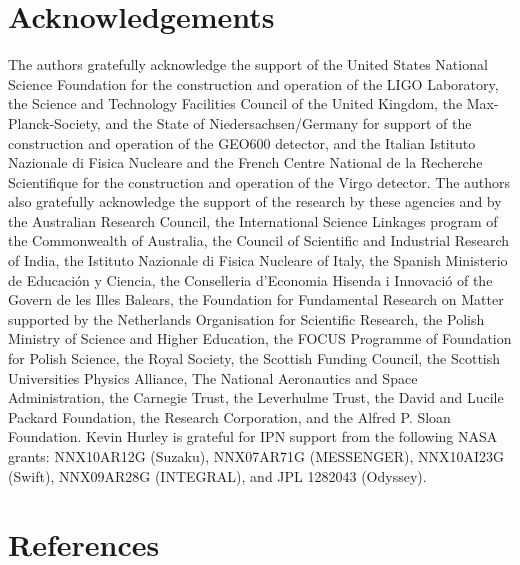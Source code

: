 \documentclass[a4paper]{jpconf}
\begin{document}
\section*{Acknowledgements}

The authors gratefully acknowledge the support of the United States
National Science Foundation for the construction and operation of the
LIGO Laboratory, the Science and Technology Facilities Council of the
United Kingdom, the Max-Planck-Society, and the State of
Niedersachsen/Germany for support of the construction and operation of
the GEO600 detector, and the Italian Istituto Nazionale di Fisica
Nucleare and the French Centre National de la Recherche Scientifique
for the construction and operation of the Virgo detector. The authors
also gratefully acknowledge the support of the research by these
agencies and by the Australian Research Council,
the International Science Linkages program of the Commonwealth of Australia,
the Council of Scientific and Industrial Research of India,
the Istituto Nazionale di Fisica Nucleare of Italy,
the Spanish Ministerio de Educaci\'on y Ciencia,
the Conselleria d'Economia Hisenda i Innovaci\'o of the
Govern de les Illes Balears, the Foundation for Fundamental Research
on Matter supported by the Netherlands Organisation for Scientific Research,
the Polish Ministry of Science and Higher Education, the FOCUS
Programme of Foundation for Polish Science,
the Royal Society, the Scottish Funding Council, the
Scottish Universities Physics Alliance, The National Aeronautics and
Space Administration, the Carnegie Trust, the Leverhulme Trust, the
David and Lucile Packard Foundation, the Research Corporation, and
the Alfred P. Sloan Foundation. Kevin Hurley is grateful for IPN support from
the following NASA grants: NNX10AR12G (Suzaku), NNX07AR71G (MESSENGER),
NNX10AI23G (Swift), NNX09AR28G (INTEGRAL), and JPL 1282043 (Odyssey).
 
\section*{References}


\end{document}
